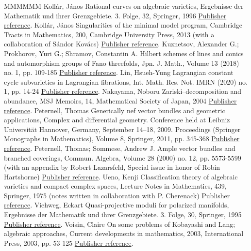 \documentclass[11pt]{article}
\theoremstyle{definition}
\numberwithin{equation}{section}
\numberwithin{figure}{section}
\numberwithin{table}{section}
\begin{document}
\begin{thebibliography}{MMMMMM}
 Kollár, János Rational curves on algebraic varieties, Ergebnisse der Mathematik und ihrer Grenzgebiete. 3. Folge, 32, Springer, 1996 \href{https://ahl.centre-mersenne.org/item/AHL_2020__3__473_0/#Kol96}{Publisher reference}.
 Kollár, János Singularities of the minimal model program, Cambridge Tracts in Mathematics, 200, Cambridge University Press, 2013 (with a collaboration of Sándor Kovács) \href{https://ahl.centre-mersenne.org/item/AHL_2020__3__473_0/#Kol13}{Publisher reference}.
 Kuznetsov, Alexander G.; Prokhorov, Yuri G.; Shramov, Constantin A. Hilbert schemes of lines and conics and automorphism groups of Fano threefolds, Jpn. J. Math., Volume 13 (2018) no. 1, pp. 109-185 \href{https://ahl.centre-mersenne.org/item/AHL_2020__3__473_0/#KPS16}{Publisher reference}.
 Lin, Hsueh-Yung Lagrangian constant cycle subvarieties in Lagrangian fibrations, Int. Math. Res. Not. IMRN (2020) no. 1, pp. 14-24 \href{https://ahl.centre-mersenne.org/item/AHL_2020__3__473_0/#Lin15}{Publisher reference}.
 Nakayama, Noboru Zariski–decomposition and abundance, MSJ Memoirs, 14, Mathematical Society of Japan, 2004 \href{https://ahl.centre-mersenne.org/item/AHL_2020__3__473_0/#Nak04}{Publisher reference}.
 Peternell, Thomas Generically nef vector bundles and geometric applications, Complex and differential geometry. Conference held at Leibniz Universität Hannover, Germany, September 14–18, 2009. Proceedings (Springer Monographs in Mathematics), Volume 8, Springer, 2011, pp. 345-368 \href{https://ahl.centre-mersenne.org/item/AHL_2020__3__473_0/#Pe11}{Publisher reference}.
 Peternell, Thomas; Sommese, Andrew J. Ample vector bundles and branched coverings, Commun. Algebra, Volume 28 (2000) no. 12, pp. 5573-5599 (with an appendix by Robert Lazarsfeld, Special issue in honor of Robin Hartshorne) \href{https://ahl.centre-mersenne.org/item/AHL_2020__3__473_0/#PS00}{Publisher reference}.
 Ueno, Kenji Classification theory of algebraic varieties and compact complex spaces, Lecture Notes in Mathematics, 439, Springer, 1975 (notes written in collaboration with P. Cherenack) \href{https://ahl.centre-mersenne.org/item/AHL_2020__3__473_0/#Ue75}{Publisher reference}.
 Viehweg, Eckart Quasi-projective moduli for polarized manifolds, Ergebnisse der Mathematik und ihrer Grenzgebiete. 3. Folge, 30, Springer, 1995 \href{https://ahl.centre-mersenne.org/item/AHL_2020__3__473_0/#Vi95}{Publisher reference}.
 Voisin, Claire On some problems of Kobayashi and Lang; algebraic approaches, Current developments in mathematics, 2003, International Press, 2003, pp. 53-125 \href{https://ahl.centre-mersenne.org/item/AHL_2020__3__473_0/#Voi03}{Publisher reference}.
\end{thebibliography}
\end{document}
